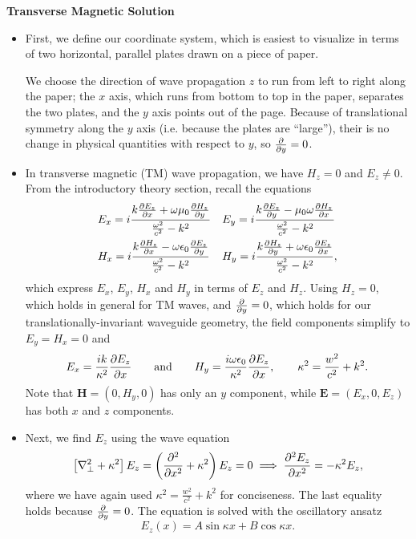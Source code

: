 \documentclass[11pt, a4paper]{article}
\newcommand{\eqtext}[1]{\qquad \text{#1} \qquad}
\renewcommand{\vec}[1]{\bm{#1}} %
\newcommand{\E}{\vec{E}}  %
\renewcommand{\H}{\vec{H}}  %
\newcommand{\ee}{\epsilon_{0}}  %
\newcommand{\mm}{\mu_{0}}  %
\newcommand{\m}{\vec{m}}  %
\renewcommand{\laplacian}{\nabla^{2}}
\begin{document}
\vspace{2mm}
\textbf{Transverse Magnetic Solution}
\begin{itemize}
	\item First, we define our coordinate system, which is easiest to visualize in terms of two horizontal, parallel plates drawn on a piece of paper.
	
	We choose the direction of wave propagation $ z $ to run from left to right along the paper; the $ x $ axis, which runs from bottom to top in the paper, separates the two plates, and the $ y $ axis points out of the page. Because of translational symmetry along the $ y $ axis (i.e. because the plates are ``large''), their is no change in physical quantities with respect to $ y $, so $ \pdv{y} = 0 $.
	
	\item In transverse magnetic (TM) wave propagation, we have $ H_{z} = 0 $ and $ E_{z} \neq 0 $. From the introductory theory section, recall the equations
	\begin{align*}
		&E_{x} = i \frac{k \pdv{E_{z}}{x} + \omega \mm \pdv{H_{z}}{y}}{\frac{\omega^{2}}{c^{2}} - k^{2}} && E_{y} = i \frac{k \pdv{E_{z}}{y} - \mm \omega \pdv{H_{z}}{x}}{\frac{\omega^{2}}{c^{2}} - k^{2}}\\
		&H_{x} = i \frac{k\pdv{H_{z}}{x} - \omega \ee \pdv{E_{z}}{y}}{\frac{\omega^{2}}{c^{2}} - k^{2}} && H_{y} = i \frac{k\pdv{H_{z}}{y} + \omega \ee \pdv{E_{z}}{x}}{\frac{\omega^{2}}{c^{2}} - k^{2}},
	\end{align*}
	which express $ E_{x}$, $ E_{y} $, $ H_{x} $ and $ H_{y} $ in terms of $ E_{z} $ and $ H_{z} $. Using $ H_{z} = 0 $, which holds in general for TM waves, and $ \pdv{y} = 0 $, which holds for our translationally-invariant waveguide geometry, the field components simplify to $ E_{y} = H_{x} = 0 $ and
	\begin{align*}
		E_{x} = \frac{ik}{\kappa^{2}} \pdv{E_{z}}{x} \eqtext{and} H_{y} = \frac{i\omega \ee}{\kappa^{2}}\pdv{E_{z}}{x}, \qquad \kappa^{2} = \frac{w^{2}}{c^{2}} + k^{2}.
	\end{align*}
	Note that $ \H = (0, H_{y}, 0) $ has only an $ y $ component, while $ \E = (E_{x}, 0, E_{z}) $ has both $ x $ and $ z $ components.
	
	\item Next, we find $ E_{z} $ using the wave equation
	\begin{equation*}
		\left[\laplacian_{\perp} + \kappa^{2}\right]E_{z} = \left(\pdv[2]{}{x} + \kappa^{2}\right)E_{z} = 0 \implies \pdv[2]{E_{z}}{x} = - \kappa^{2}E_{z},
	\end{equation*}
	where we have again used $ \kappa^{2} = \frac{w^{2}}{c^{2}} + k^{2} $ for conciseness. The last equality holds because $ \pdv{y} = 0 $. The equation is solved with the oscillatory ansatz
	\begin{equation*}
		E_{z}(x) = A\sin \kappa x + B \cos \kappa x.
	\end{equation*}
	

\end{itemize}
\end{document}
